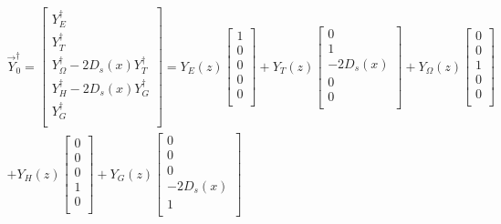 \begin{align}
\vec{Y}^{\dagger}_0= \left[\begin{array}{c}
Y_E^{\dagger} \\ 
Y_T^{\dagger} \\
Y_\Omega^{\dagger}-2 D_s(x) Y_T^{\dagger}\\
Y_H^{\dagger}-2 D_s(x) Y_G^{\dagger} \\
Y_G^{\dagger} \\ 
\end{array}\right] = 
Y_E(z)\left[\begin{array}{c}
1 \\ 
0 \\
0 \\
0 \\
0 \\ 
\end{array}\right] + Y_T(z)\left[\begin{array}{c}
0 \\ 
1 \\
-2 D_s(x)\\
0 \\
0 \\ 
\end{array}\right] + Y_\Omega(z)\left[\begin{array}{c}
0 \\ 
0 \\
1 \\
0 \\
0 \\ 
\end{array}\right]\\
+ Y_H(z)\left[\begin{array}{c}
0 \\ 
0 \\
0 \\
1 \\
0 \\ 
\end{array}\right]+ Y_G(z)\left[\begin{array}{c}
0 \\ 
0 \\
0 \\
-2 D_s(x)\\
1 \\ 
\end{array}\right] 
\end{align}


